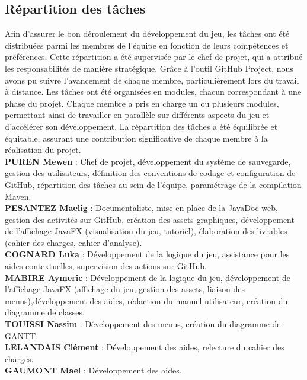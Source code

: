 \subsection{Répartition des tâches}

Afin d'assurer le bon déroulement du développement du jeu, les tâches ont été distribuées parmi les membres de l'équipe en fonction de leurs compétences et préférences. Cette répartition a été supervisée par le chef de projet, qui a attribué les responsabilités de manière stratégique. Grâce à l'outil GitHub Project, nous avons pu suivre l'avancement de chaque membre, particulièrement lors du travail à distance. Les tâches ont été organisées en modules, chacun correspondant à une phase du projet. Chaque membre a pris en charge un ou plusieurs modules, permettant ainsi de travailler en parallèle sur différents aspects du jeu et d'accélérer son développement. La répartition des tâches a été équilibrée et équitable, assurant une contribution significative de chaque membre à la réalisation du projet. \\

\textbf{PUREN Mewen} : Chef de projet, développement du système de sauvegarde, gestion des utilisateurs, définition des conventions de codage et configuration de GitHub, répartition des tâches au sein de l’équipe, paramétrage de la compilation Maven. \\

\textbf{PESANTEZ Maelig} : Documentaliste, mise en place de la JavaDoc web, gestion des activités sur GitHub, création des assets graphiques, développement de l’affichage JavaFX (visualisation du jeu, tutoriel), élaboration des livrables (cahier des charges, cahier d’analyse). \\

\textbf{COGNARD Luka} : Développement de la logique du jeu, assistance pour les aides contextuelles, supervision des actions sur GitHub. \\

\textbf{MABIRE Aymeric} : Développement de la logique du jeu, développement de l’affichage JavaFX (affichage du jeu, gestion des assets, liaison des menus),développement des aides, rédaction du manuel utilisateur, création du diagramme de classes. \\

\textbf{TOUISSI Nassim} : Développement des menus, création du diagramme de GANTT. \\

\textbf{LELANDAIS Clément} : Développement des aides, relecture du cahier des charges. \\

\textbf{GAUMONT Mael} : Développement des aides.

